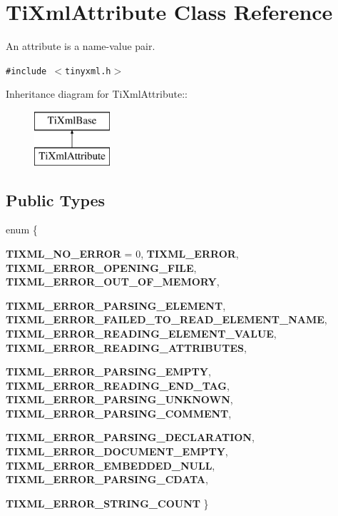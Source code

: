\section{Ti\-Xml\-Attribute Class Reference}
\label{classTiXmlAttribute}
An attribute is a name-value pair.  


{\tt \#include $<$tinyxml.h$>$}

Inheritance diagram for Ti\-Xml\-Attribute::\begin{figure}[H]
\begin{center}
\leavevmode
\includegraphics[height=2cm]{classTiXmlAttribute}
\end{center}
\end{figure}
\subsection*{Public Types}
\begin{CompactItemize}
\item 
enum \{ \par
{\bf TIXML\_\-NO\_\-ERROR} =  0, 
{\bf TIXML\_\-ERROR}, 
{\bf TIXML\_\-ERROR\_\-OPENING\_\-FILE}, 
{\bf TIXML\_\-ERROR\_\-OUT\_\-OF\_\-MEMORY}, 
\par
{\bf TIXML\_\-ERROR\_\-PARSING\_\-ELEMENT}, 
{\bf TIXML\_\-ERROR\_\-FAILED\_\-TO\_\-READ\_\-ELEMENT\_\-NAME}, 
{\bf TIXML\_\-ERROR\_\-READING\_\-ELEMENT\_\-VALUE}, 
{\bf TIXML\_\-ERROR\_\-READING\_\-ATTRIBUTES}, 
\par
{\bf TIXML\_\-ERROR\_\-PARSING\_\-EMPTY}, 
{\bf TIXML\_\-ERROR\_\-READING\_\-END\_\-TAG}, 
{\bf TIXML\_\-ERROR\_\-PARSING\_\-UNKNOWN}, 
{\bf TIXML\_\-ERROR\_\-PARSING\_\-COMMENT}, 
\par
{\bf TIXML\_\-ERROR\_\-PARSING\_\-DECLARATION}, 
{\bf TIXML\_\-ERROR\_\-DOCUMENT\_\-EMPTY}, 
{\bf TIXML\_\-ERROR\_\-EMBEDDED\_\-NULL}, 
{\bf TIXML\_\-ERROR\_\-PARSING\_\-CDATA}, 
\par
{\bf TIXML\_\-ERROR\_\-STRING\_\-COUNT}
 \}
\end{CompactItemize}
